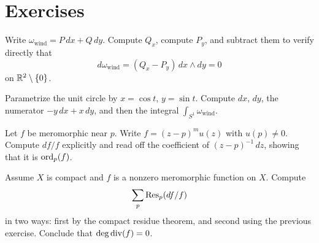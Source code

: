 \section*{Exercises}

\begin{exercise}
Write \(\omega_{\mathrm{wind}}=P\,dx+Q\,dy\).  Compute \(Q_x\), compute
\(P_y\), and subtract them to verify directly that
\[
  d\omega_{\mathrm{wind}}=(Q_x-P_y)\,dx\wedge dy=0
\]
on \(\mathbb{R}^2\setminus\{0\}\).
\end{exercise}

\begin{exercise}
Parametrize the unit circle by \(x=\cos t\), \(y=\sin t\).  Compute \(dx\),
\(dy\), the numerator \(-y\,dx+x\,dy\), and then the integral
\(\int_{S^1}\omega_{\mathrm{wind}}\).
\end{exercise}

\begin{exercise}
Let \(f\) be meromorphic near \(p\).  Write \(f=(z-p)^m u(z)\) with
\(u(p)\ne0\).  Compute \(df/f\) explicitly and read off the coefficient of
\((z-p)^{-1}\,dz\), showing that it is \(\operatorname{ord}_p(f)\).
\end{exercise}

\begin{exercise}
Assume \(X\) is compact and \(f\) is a nonzero meromorphic function on \(X\).
Compute
\[
  \sum_p\operatorname{Res}_p(df/f)
\]
in two ways: first by the compact residue theorem, and second using the previous
exercise.  Conclude that \(\operatorname{deg}\operatorname{div}(f)=0\).
\end{exercise}
